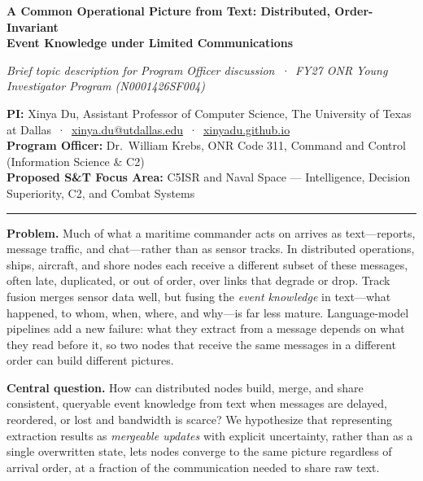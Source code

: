 \documentclass[11pt]{article}
\newcommand{\head}[1]{{\color{navy}\textbf{#1}}\enspace}
\newcommand{\POline}{Dr.\ William Krebs, ONR Code 311, Command and Control (Information Science \& C2)}
\newcommand{\FocusArea}{C5ISR and Naval Space --- Intelligence, Decision Superiority, C2, and Combat Systems}
\begin{document}
\begin{center}
{\fontsize{15.5}{18.5}\selectfont\bfseries\color{navy} A Common Operational Picture from Text: Distributed, Order-Invariant\\[1pt] Event Knowledge under Limited Communications\par}
\vspace{3pt}
{\small\itshape Brief topic description for Program Officer discussion \,·\, FY27 ONR Young Investigator Program (N0001426SF004)\par}
\end{center}
\vspace{-2pt}
{\small
\textbf{PI:} Xinya Du, Assistant Professor of Computer Science, The University of Texas at Dallas \,·\, \href{mailto:xinya.du@utdallas.edu}{xinya.du@utdallas.edu} \,·\, \href{https://xinyadu.github.io}{xinyadu.github.io}\\
\textbf{Program Officer:} \POline\\
\textbf{Proposed S\&T Focus Area:} \FocusArea\par}
\vspace{-3pt}
{\color{navy}\rule{\linewidth}{0.6pt}}

\head{Problem.} Much of what a maritime commander acts on arrives as text---reports, message traffic, and chat---rather than as sensor tracks. In distributed operations, ships, aircraft, and shore nodes each receive a different subset of these messages, often late, duplicated, or out of order, over links that degrade or drop. Track fusion merges sensor data well, but fusing the \emph{event knowledge} in text---what happened, to whom, when, where, and why---is far less mature. Language-model pipelines add a new failure: what they extract from a message depends on what they read before it, so two nodes that receive the same messages in a different order can build different pictures.

\head{Central question.} How can distributed nodes build, merge, and share consistent, queryable event knowledge from text when messages are delayed, reordered, or lost and bandwidth is scarce? We hypothesize that representing extraction results as \emph{mergeable updates} with explicit uncertainty, rather than as a single overwritten state, lets nodes converge to the same picture regardless of arrival order, at a fraction of the communication needed to share raw text.
\end{document}
